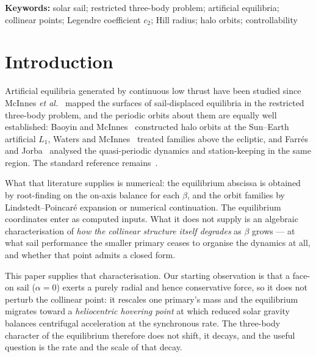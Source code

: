 \documentclass[11pt,a4paper]{article}
\begin{document}
\noindent\textbf{Keywords:} solar sail; restricted three-body problem;
artificial equilibria; collinear points; Legendre coefficient $c_2$;
Hill radius; halo orbits; controllability

\section{Introduction}

Artificial equilibria generated by continuous low thrust have been studied since
McInnes \emph{et al.}~\cite{mcinnes1994} mapped the surfaces of sail-displaced
equilibria in the restricted three-body problem, and the periodic orbits about
them are equally well established: Baoyin and McInnes~\cite{baoyin2006}
constructed halo orbits at the Sun--Earth artificial $L_1$, Waters and
McInnes~\cite{waters2007} treated families above the ecliptic, and Farr\'es and
Jorba~\cite{farres2010,farres2016} analysed the quasi-periodic dynamics and
station-keeping in the same region. The standard reference
remains~\cite{mcinnes1999}.

What that literature supplies is numerical: the equilibrium abscissa is obtained
by root-finding on the on-axis balance for each $\beta$, and the orbit families
by Lindstedt--Poincar\'e expansion or numerical continuation. The equilibrium
coordinates enter as computed inputs. What it does not supply is an algebraic
characterisation of \emph{how the collinear structure itself degrades} as $\beta$
grows --- at what sail performance the smaller primary ceases to organise the
dynamics at all, and whether that point admits a closed form.

This paper supplies that characterisation. Our starting observation is that a
face-on sail ($\alpha=0$) exerts a purely radial and hence conservative force,
so it does not perturb the collinear point: it rescales one primary's mass and
the equilibrium migrates toward a \emph{heliocentric hovering point} at which
reduced solar gravity balances centrifugal acceleration at the synchronous rate.
The three-body character of the equilibrium therefore does not shift, it decays,
and the useful question is the rate and the scale of that decay.
\end{document}
